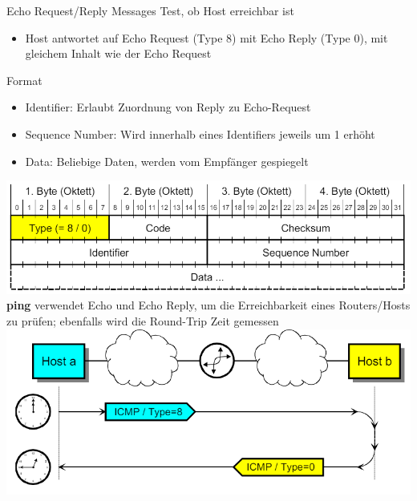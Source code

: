 \begin{definition}{Echo Request/Reply Messages}
    Test, ob Host erreichbar ist
    \begin{itemize}
        \item Host antwortet auf Echo Request (Type 8) mit Echo Reply (Type 0), mit gleichem Inhalt wie der Echo Request
    \end{itemize}
    Format
    \begin{itemize}
        \item Identifier: Erlaubt Zuordnung von Reply zu Echo-Request
        \item Sequence Number: Wird innerhalb eines Identifiers jeweils um 1 erhöht
        \item Data: Beliebige Daten, werden vom Empfänger gespiegelt
    \end{itemize}
        \includegraphics[width=0.75\linewidth]{images/icmp_echorequest.png}\\
    \textbf{ping} verwendet Echo und Echo Reply, um die Erreichbarkeit eines Routers/Hosts zu prüfen; ebenfalls wird die Round-Trip Zeit gemessen\\
        \includegraphics[width=0.75\linewidth]{images/ping.png}
\end{definition}

